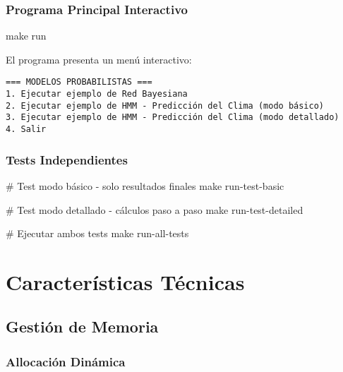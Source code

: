 \documentclass[
]{article}
\newenvironment{Shaded}{\begin{snugshade}}{\end{snugshade}}
\newcommand{\CommentTok}[1]{\textcolor[rgb]{0.37,0.37,0.37}{#1}}
\newcommand{\FunctionTok}[1]{\textcolor[rgb]{0.28,0.35,0.67}{#1}}
\newcommand{\NormalTok}[1]{\textcolor[rgb]{0.00,0.23,0.31}{#1}}
\begin{document}
\subsubsection{Programa Principal
Interactivo}\label{programa-principal-interactivo}

\begin{Shaded}
\begin{Highlighting}[]
\FunctionTok{make}\NormalTok{ run}
\end{Highlighting}
\end{Shaded}

El programa presenta un menú interactivo:

\begin{verbatim}
=== MODELOS PROBABILISTAS ===
1. Ejecutar ejemplo de Red Bayesiana
2. Ejecutar ejemplo de HMM - Predicción del Clima (modo básico)
3. Ejecutar ejemplo de HMM - Predicción del Clima (modo detallado)
4. Salir
\end{verbatim}

\subsubsection{Tests Independientes}\label{tests-independientes}

\begin{Shaded}
\begin{Highlighting}[]
\CommentTok{\# Test modo básico {-} solo resultados finales}
\FunctionTok{make}\NormalTok{ run{-}test{-}basic}

\CommentTok{\# Test modo detallado {-} cálculos paso a paso}
\FunctionTok{make}\NormalTok{ run{-}test{-}detailed}

\CommentTok{\# Ejecutar ambos tests}
\FunctionTok{make}\NormalTok{ run{-}all{-}tests}
\end{Highlighting}
\end{Shaded}

\section{Características Técnicas}\label{caracteruxedsticas-tuxe9cnicas}

\subsection{Gestión de Memoria}\label{gestiuxf3n-de-memoria}

\subsubsection{Allocación Dinámica}\label{allocaciuxf3n-dinuxe1mica}
\end{document}

